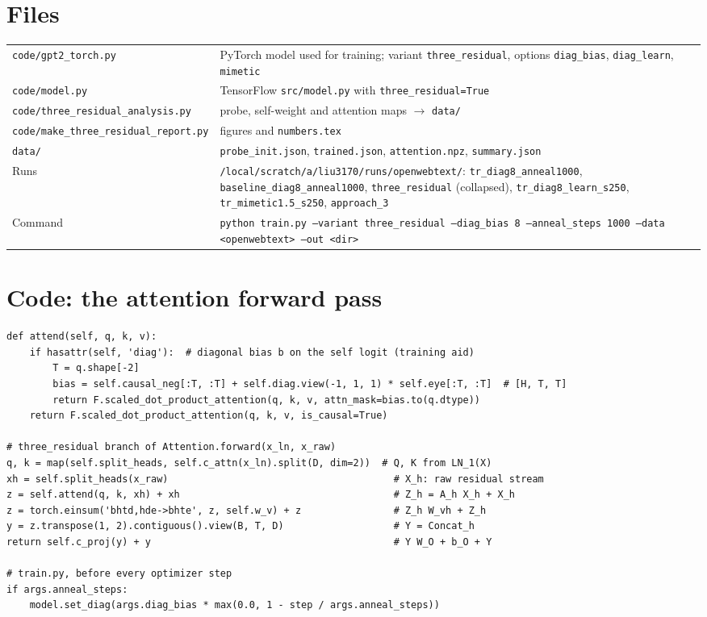 \documentclass[11pt]{article}
\newcommand{\code}[1]{\texttt{#1}}
\begin{document}
\section*{Files}
\begin{tabularx}{\linewidth}{lX}
\code{code/gpt2\_torch.py} & PyTorch model used for training; variant \code{three\_residual}, options
\code{diag\_bias}, \code{diag\_learn}, \code{mimetic} \\
\code{code/model.py} & TensorFlow \code{src/model.py} with \code{three\_residual=True} \\
\code{code/three\_residual\_analysis.py} & probe, self-weight and attention maps $\rightarrow$ \code{data/} \\
\code{code/make\_three\_residual\_report.py} & figures and \code{numbers.tex} \\
\code{data/} & \code{probe\_init.json}, \code{trained.json}, \code{attention.npz}, \code{summary.json} \\
Runs & \code{/local/scratch/a/liu3170/runs/openwebtext/}: \code{tr\_diag8\_anneal1000},
\code{baseline\_diag8\_anneal1000}, \code{three\_residual} (collapsed), \code{tr\_diag8\_learn\_s250},
\code{tr\_mimetic1.5\_s250}, \code{approach\_3} \\
Command & \code{python train.py --variant three\_residual --diag\_bias 8 --anneal\_steps 1000 --data <openwebtext> --out <dir>} \\
\end{tabularx}

\appendix
\section{Code: the attention forward pass}
\begin{lstlisting}
def attend(self, q, k, v):
    if hasattr(self, 'diag'):  # diagonal bias b on the self logit (training aid)
        T = q.shape[-2]
        bias = self.causal_neg[:T, :T] + self.diag.view(-1, 1, 1) * self.eye[:T, :T]  # [H, T, T]
        return F.scaled_dot_product_attention(q, k, v, attn_mask=bias.to(q.dtype))
    return F.scaled_dot_product_attention(q, k, v, is_causal=True)

# three_residual branch of Attention.forward(x_ln, x_raw)
q, k = map(self.split_heads, self.c_attn(x_ln).split(D, dim=2))  # Q, K from LN_1(X)
xh = self.split_heads(x_raw)                                       # X_h: raw residual stream
z = self.attend(q, k, xh) + xh                                     # Z_h = A_h X_h + X_h
z = torch.einsum('bhtd,hde->bhte', z, self.w_v) + z                # Z_h W_vh + Z_h
y = z.transpose(1, 2).contiguous().view(B, T, D)                   # Y = Concat_h
return self.c_proj(y) + y                                          # Y W_O + b_O + Y

# train.py, before every optimizer step
if args.anneal_steps:
    model.set_diag(args.diag_bias * max(0.0, 1 - step / args.anneal_steps))
\end{lstlisting}
\end{document}
